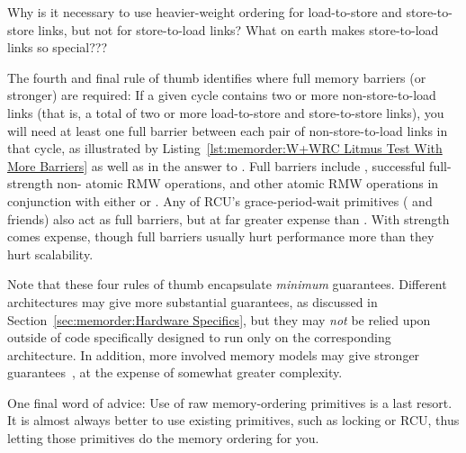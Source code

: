 \QuickQuiz{}
	Why is it necessary to use heavier-weight ordering for
	load-to-store and store-to-store links, but not for
	store-to-load links?
	What on earth makes store-to-load links so special???
 \QuickQuizEnd

The fourth and final rule of thumb identifies where full memory barriers
(or stronger) are required:
If a given cycle contains two or more non-store-to-load links (that is,
a total of two or more load-to-store and store-to-store links), you will
need at least one full barrier between each pair of non-store-to-load
links in that cycle, as illustrated by
Listing~\ref{lst:memorder:W+WRC Litmus Test With More Barriers}
as well as in the answer to
\QuickQuizARef{\MemorderQQLitmusTestR}.
Full barriers include , successful full-strength non-
atomic RMW operations, and other atomic RMW operations in conjunction with
either  or .
Any of RCU's grace-period-wait primitives ( and
friends) also act as full barriers, but at far greater expense than
.
With strength comes expense, though full barriers
usually hurt performance more than they hurt scalability.

Note that these four rules of thumb encapsulate \emph{minimum} guarantees.
Different architectures may give
more substantial guarantees,
as discussed in Section~\ref{sec:memorder:Hardware Specifics},
but they may \emph{not}
be relied upon outside of code specifically designed to run only on
the corresponding architecture.
In addition, more involved memory models may give stronger
guarantees~\cite{Alglave:2018:FSC:3173162.3177156}, at the
expense of somewhat greater complexity.

One final word of advice: Use of raw memory-ordering primitives is
a last resort.
It is almost always better to use existing primitives, such as locking
or RCU, thus letting those primitives do the memory ordering for you.

